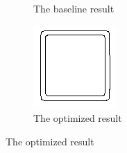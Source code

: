 \documentclass[10pt,final,journal]{IEEEtran}
\begin{document}
\begin{figure}[h!]
\begin{subfigure}[b]{0.3\textwidth}
            \caption{The baseline result}
            \label{fig:app_square_baseline}
    \end{subfigure}
    \begin{subfigure}[b]{0.3\textwidth}
            \includegraphics[width=\textwidth]{square_out}
            \caption{The optimized result}
            \label{fig:app_square_out}
    \end{subfigure}


\end{figure}
\end{document}
